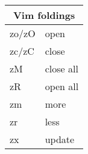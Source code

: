 \documentclass[12pt,paper=landscape,paper=a4]{scrartcl}
\begin{document}
\begin{multicols}{3}
    \vspace{1em}

    \begin{tabular}{ll}
        \multicolumn{2}{c}{Vim foldings}\\
        \hline
        zo/zO  & open \\
        zc/zC  & close\\
        zM     & close all\\
        zR     & open all\\
        zm     & more\\
        zr     & less\\
        zx     & update\\
    \end{tabular}
\end{multicols}
\end{document}
